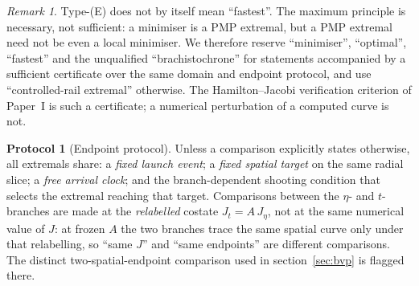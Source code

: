 \documentclass[12pt]{iopart}
\theoremstyle{plain}
\theoremstyle{definition}
\newtheorem{protocol}{Protocol}
\theoremstyle{remark}
\newtheorem{remark}[proposition]{Remark}
\begin{document}
\begin{remark}
Type-(E) does not by itself mean ``fastest''. The maximum principle is necessary,
not sufficient: a minimiser is a PMP extremal, but a PMP extremal need not be
even a local minimiser. We therefore reserve ``minimiser'', ``optimal'',
``fastest'' and the unqualified ``brachistochrone'' for statements accompanied by
a sufficient certificate over the same domain and endpoint protocol, and use
``controlled-rail extremal'' otherwise. The Hamilton--Jacobi verification
criterion of Paper~I is such a certificate; a numerical perturbation of a
computed curve is not.
\end{remark}

\begin{protocol}[Endpoint protocol]
\label{prot:endpoint}
Unless a comparison explicitly states otherwise, all extremals share: a
\emph{fixed launch event}; a \emph{fixed spatial target} on the same radial slice;
a \emph{free arrival clock}; and the branch-dependent shooting condition that
selects the extremal reaching that target. Comparisons between the $\eta$- and
$t$-branches are made at the \emph{relabelled} costate $J_t=A\,J_\eta$, not at the
same numerical value of $J$: at frozen $A$ the two branches trace the same spatial
curve only under that relabelling, so ``same $J$'' and ``same endpoints'' are
different comparisons. The distinct two-spatial-endpoint comparison used in
section~\ref{sec:bvp} is flagged there.
\end{protocol}
\end{document}
